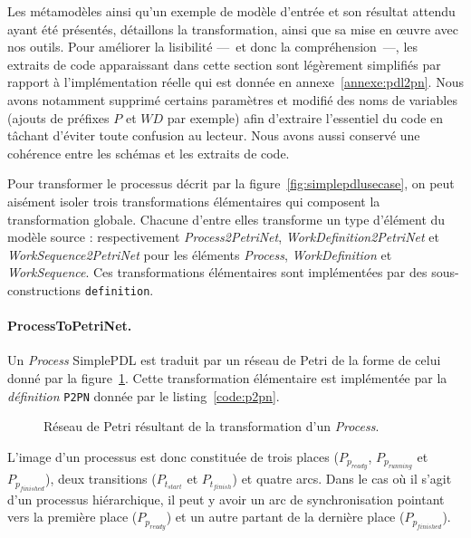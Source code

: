 Les métamodèles ainsi qu'un exemple de modèle d'entrée et son résultat attendu
ayant été présentés, détaillons la transformation, ainsi que sa mise en œuvre
avec nos outils. Pour améliorer la lisibilité ---~et donc la compréhension~---,
les extraits de code apparaissant dans cette section sont légèrement simplifiés
par rapport à l'implémentation réelle qui est donnée en
annexe~\ref{annexe:pdl2pn}. Nous avons notamment supprimé certains paramètres
et modifié des noms de variables (ajouts de préfixes $P$ et $WD$ par exemple)
afin d'extraire l'essentiel du code en tâchant d'éviter toute confusion au
lecteur.  Nous avons aussi conservé une cohérence entre les schémas et les
extraits de code.

Pour transformer le processus décrit par la figure~\ref{fig:simplepdlusecase},
on peut aisément isoler trois transformations élémentaires qui composent la
transformation globale. Chacune d'entre elles transforme un type d'élément du
modèle source : respectivement \emph{Process2PetriNet},
\emph{WorkDefinition2PetriNet} et \emph{WorkSequence2PetriNet} pour les
éléments \emph{Process}, \emph{WorkDefinition} et \emph{WorkSequence}. Ces
transformations élémentaires sont implémentées par des sous-constructions
\texttt{definition}.

\paragraph{ProcessToPetriNet.} Un \emph{Process} SimplePDL est traduit par un
réseau de Petri de la forme de celui donné par la
figure~\ref{fig:PNProcess}. Cette transformation élémentaire est
implémentée par la \emph{définition} \texttt{P2PN} donnée par le
listing~\ref{code:p2pn}.

\begin{figure}[h]
  \begin{center}
    
  \end{center}
  \caption{Réseau de Petri résultant de la transformation d'un \emph{Process}.}
  \label{fig:PNProcess}
\end{figure}

L'image d'un processus est donc constituée de trois places ($P_{p_{ready}}$,
$P_{p_{running}}$ et $P_{p_{finished}}$), deux transitions ($P_{t_{start}}$ et
$P_{t_{finish}}$) et quatre arcs. Dans le cas où il s’agit d'un processus
hiérarchique, il peut y avoir un arc de synchronisation pointant vers la
première place ($P_{p_{ready}}$) et un autre partant de la dernière place
($P_{p_{finished}}$).

